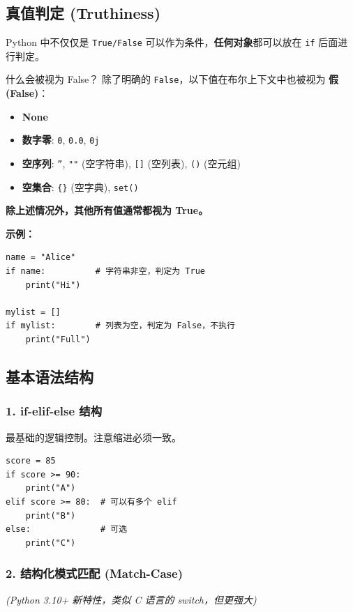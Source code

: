 \documentclass[12pt, a4paper]{article}
\begin{document}
\subsection{真值判定 (Truthiness)}

Python 中不仅仅是 \texttt{True/False} 可以作为条件，\textbf{任何对象}都可以放在 \texttt{if} 后面进行判定。

\begin{trapbox}{什么会被视为 False？}
除了明确的 \texttt{False}，以下值在布尔上下文中也被视为 \textbf{假 (False)}：
\begin{itemize}
    \item \textbf{None}
    \item \textbf{数字零}: \texttt{0}, \texttt{0.0}, \texttt{0j}
    \item \textbf{空序列}: \texttt{''}, \texttt{""} (空字符串), \texttt{[]} (空列表), \texttt{()} (空元组)
    \item \textbf{空集合}: \texttt{\{\}} (空字典), \texttt{set()}
\end{itemize}
\textbf{除上述情况外，其他所有值通常都视为 True。}
\end{trapbox}

\textbf{示例：}
\begin{lstlisting}
name = "Alice"
if name:          # 字符串非空，判定为 True
    print("Hi")
    
mylist = []
if mylist:        # 列表为空，判定为 False，不执行
    print("Full")
\end{lstlisting}

\newpage

\subsection{基本语法结构}

\subsubsection{1. if-elif-else 结构}
最基础的逻辑控制。注意缩进必须一致。

\begin{lstlisting}
score = 85
if score >= 90:
    print("A")
elif score >= 80:  # 可以有多个 elif
    print("B")
else:              # 可选
    print("C")
\end{lstlisting}

\subsubsection{2. 结构化模式匹配 (Match-Case)}
\textit{(Python 3.10+ 新特性，类似 C 语言的 switch，但更强大)}
\end{document}
